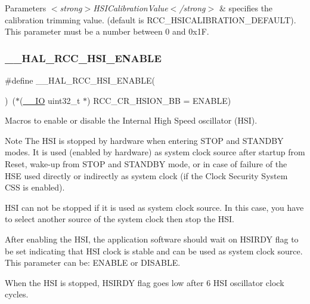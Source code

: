 \begin{DoxyParams}{Parameters}
{\em $<$strong$>$\+H\+S\+I\+Calibration\+Value$<$/strong$>$} & specifies the calibration trimming value. (default is R\+C\+C\+\_\+\+H\+S\+I\+C\+A\+L\+I\+B\+R\+A\+T\+I\+O\+N\+\_\+\+D\+E\+F\+A\+U\+LT). This parameter must be a number between 0 and 0x1F. \\
\hline
\end{DoxyParams}
\mbox{\label{group___r_c_c___h_s_i___configuration_gaab944f562b53fc74bcc0e4958388fd42}} 
\subsubsection{\texorpdfstring{\+\_\+\+\_\+\+H\+A\+L\+\_\+\+R\+C\+C\+\_\+\+H\+S\+I\+\_\+\+E\+N\+A\+B\+LE}{\_\_HAL\_RCC\_HSI\_ENABLE}}
{\footnotesize\ttfamily \#define \+\_\+\+\_\+\+H\+A\+L\+\_\+\+R\+C\+C\+\_\+\+H\+S\+I\+\_\+\+E\+N\+A\+B\+LE(\begin{DoxyParamCaption}{ }\end{DoxyParamCaption})~($\ast$(\hyperlink{core__sc300_8h_aec43007d9998a0a0e01faede4133d6be}{\+\_\+\+\_\+\+IO} uint32\+\_\+t $\ast$) R\+C\+C\+\_\+\+C\+R\+\_\+\+H\+S\+I\+O\+N\+\_\+\+BB = E\+N\+A\+B\+LE)}



Macros to enable or disable the Internal High Speed oscillator (H\+SI). 

\begin{DoxyNote}{Note}
The H\+SI is stopped by hardware when entering S\+T\+OP and S\+T\+A\+N\+D\+BY modes. It is used (enabled by hardware) as system clock source after startup from Reset, wake-\/up from S\+T\+OP and S\+T\+A\+N\+D\+BY mode, or in case of failure of the H\+SE used directly or indirectly as system clock (if the Clock Security System C\+SS is enabled). 

H\+SI can not be stopped if it is used as system clock source. In this case, you have to select another source of the system clock then stop the H\+SI. 

After enabling the H\+SI, the application software should wait on H\+S\+I\+R\+DY flag to be set indicating that H\+SI clock is stable and can be used as system clock source. This parameter can be\+: E\+N\+A\+B\+LE or D\+I\+S\+A\+B\+LE. 

When the H\+SI is stopped, H\+S\+I\+R\+DY flag goes low after 6 H\+SI oscillator clock cycles. 
\end{DoxyNote}
